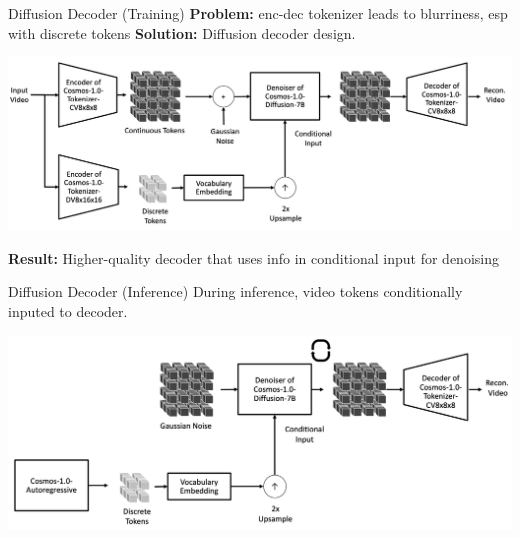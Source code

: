 \documentclass{beamer}
\begin{document}
\begin{frame}{Diffusion Decoder (Training)}
    \textbf{Problem:} enc-dec tokenizer leads to blurriness, esp with discrete tokens \newline
    \textbf{Solution:} Diffusion decoder design.
	\begin{center}
            \includegraphics[width=1.0\textwidth]{./img/auto_decoder_arc.png}
	\end{center}
    \textbf{Result:} Higher-quality decoder that uses info in conditional input for denoising


\end{frame}

\begin{frame}{Diffusion Decoder (Inference)}
    During inference, video tokens conditionally inputed to decoder.
	\begin{center}
            \includegraphics[width=1.0\textwidth]{./img/auto_arch_inf.png}
	\end{center}
\end{frame}
\end{document}
